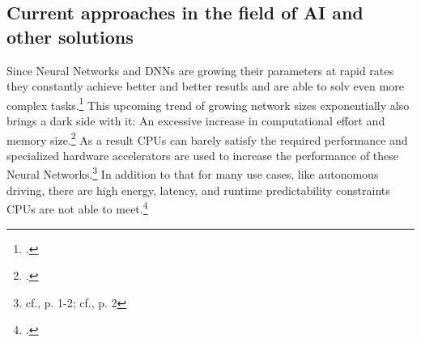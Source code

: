 \subsection{Current approaches in the field of AI and other solutions}
Since Neural Networks and \ac{DNN}s are growing their parameters at rapid rates they constantly achieve better and better resutls and are able to solv even more complex tasks.\footcite[cf.][1]{baischerLearningHardwareTutorial2021}
This upcoming trend of growing network sizes exponentially also brings a dark side with it: An excessive increase in computational effort and memory size.\footcite[cf.][1-2]{baischerLearningHardwareTutorial2021}
As a result \ac{CPU}s can barely satisfy the required performance and specialized hardware accelerators are used to increase the performance of these Neural Networks.\footnote{cf.\cite{zhouPhotonicMatrixMultiplication2022}, p. 1-2; cf.\cite{baischerLearningHardwareTutorial2021}, p. 2}
In addition to that for many use cases, like autonomous driving, there are high energy, latency, and runtime predictability constraints \ac{CPU}s are not able to meet.\footcite[cf.][2692]{ahmadOptimizingHardwareAccelerated2020}

